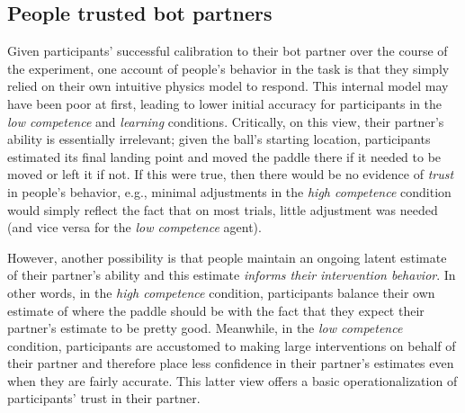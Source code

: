 \documentclass[10pt,letterpaper]{article}
\begin{document}
\subsection{People trusted bot partners}

Given participants' successful calibration to their bot partner over the course of the experiment, one account of people's behavior in the task is that they simply relied on their own intuitive physics model to respond. This internal model may have been poor at first, leading to lower initial accuracy for participants in the \textit{low competence} and \textit{learning} conditions. Critically, on this view, their partner's ability is essentially irrelevant; given the ball's starting location, participants estimated its final landing point and moved the paddle there if it needed to be moved or left it if not. If this were true, then there would be no evidence of \textit{trust} in people's behavior, e.g., minimal adjustments in the \textit{high competence} condition would simply reflect the fact that on most trials, little adjustment was needed (and vice versa for the \textit{low competence} agent). 

However, another possibility is that people maintain an ongoing latent estimate of their partner's ability and this estimate \textit{informs their intervention behavior}. In other words, in the \textit{high competence} condition, participants balance their own estimate of where the paddle should be with the fact that they expect their partner's estimate to be pretty good. Meanwhile, in the \textit{low competence} condition, participants are accustomed to making large interventions on behalf of their partner and therefore place less confidence in their partner's estimates even when they are fairly accurate. This latter view offers a basic operationalization of participants' trust in their partner.
\end{document}
